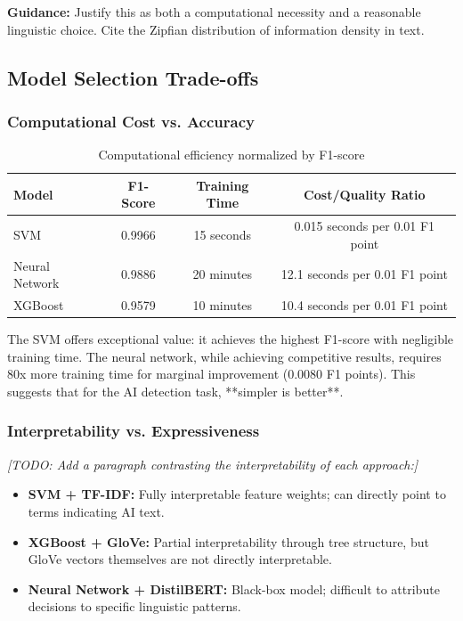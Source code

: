 \documentclass[12pt, a4paper]{article}
\begin{document}
\textbf{Guidance:} Justify this as both a computational necessity and a reasonable linguistic choice. Cite the Zipfian distribution of information density in text.

\subsection{Model Selection Trade-offs}

\subsubsection{Computational Cost vs. Accuracy}

\begin{table}[H]
\centering
\caption{Computational efficiency normalized by F1-score}
\begin{tabular}{lccc}
\toprule
\textbf{Model} & \textbf{F1-Score} & \textbf{Training Time} & \textbf{Cost/Quality Ratio} \\
\midrule
SVM & 0.9966 & 15 seconds & 0.015 seconds per 0.01 F1 point \\
Neural Network & 0.9886 & 20 minutes & 12.1 seconds per 0.01 F1 point \\
XGBoost & 0.9579 & 10 minutes & 10.4 seconds per 0.01 F1 point \\
\bottomrule
\end{tabular}
\end{table}

The SVM offers exceptional value: it achieves the highest F1-score with negligible training time. The neural network, while achieving competitive results, requires 80x more training time for marginal improvement (0.0080 F1 points). This suggests that for the AI detection task, **simpler is better**.

\subsubsection{Interpretability vs. Expressiveness}

\textit{[TODO: Add a paragraph contrasting the interpretability of each approach:]}
\begin{itemize}
    \item \textbf{SVM + TF-IDF:} Fully interpretable feature weights; can directly point to terms indicating AI text.
    \item \textbf{XGBoost + GloVe:} Partial interpretability through tree structure, but GloVe vectors themselves are not directly interpretable.
    \item \textbf{Neural Network + DistilBERT:} Black-box model; difficult to attribute decisions to specific linguistic patterns.
\end{itemize}
\end{document}
